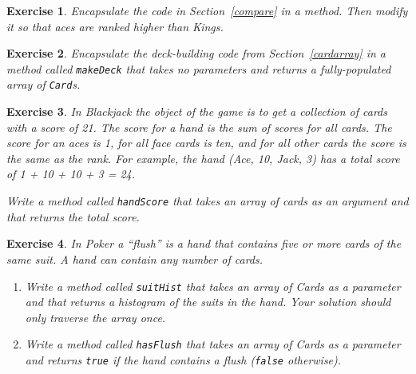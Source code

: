 \documentclass[12pt]{book}
\theoremstyle{exercise}
\newtheorem{exercise}{Exercise}[chapter]
\newcommand{\java}[1]{\lstinline{#1}} %
\begin{document}
\begin{exercise}
Encapsulate the code in Section~\ref{compare} in a method.
Then modify it so that aces are ranked higher than Kings.
\end{exercise}


\begin{exercise}
Encapsulate the deck-building code from Section~\ref{cardarray} in a method called \java{makeDeck} that takes no parameters and returns a fully-populated array of \java{Card}s.
\end{exercise}


\begin{exercise}
In Blackjack the object of the game is to get a collection of cards with a score of 21.
The score for a hand is the sum of scores for all cards.
The score for an aces is 1, for all face cards is ten, and for all other cards the score is the same as the rank.
For example, the hand (Ace, 10, Jack, 3) has a total score of 1 + 10 + 10 + 3 = 24.

Write a method called \java{handScore} that takes an array of cards as an argument and that returns the total score.
\end{exercise}


\begin{exercise}
In Poker a ``flush'' is a hand that contains five or more cards of the same suit.
A hand can contain any number of cards.

\begin{enumerate}

\item Write a method called \java{suitHist} that takes an array of Cards as a parameter and that returns a histogram of the suits in the hand.
Your solution should only traverse the array once.

\item Write a method called \java{hasFlush} that takes an array of Cards as a parameter and returns \java{true} if the hand contains a flush (\java{false} otherwise).

\end{enumerate}

\end{exercise}
\end{document}
